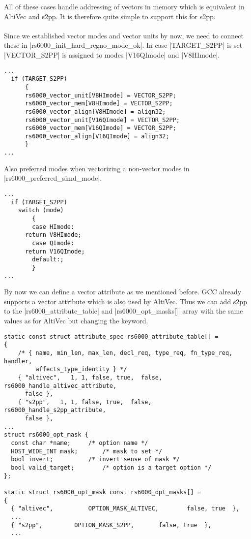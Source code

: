 All of these cases handle addressing of vectors in memory which is equivalent in AltiVec and s2pp.
It is therefore quite simple to support this for s2pp.
\\
\\
Since we established vector modes and vector units by now, we need to connect these in |rs6000_init_hard_regno_mode_ok|.
In case |TARGET_S2PP| is set |VECTOR_S2PP| is assigned to modes |V16QImode| and |V8HImode|.
\begin{lstlisting}
...
  if (TARGET_S2PP)
      {
      rs6000_vector_unit[V8HImode] = VECTOR_S2PP;
      rs6000_vector_mem[V8HImode] = VECTOR_S2PP;
      rs6000_vector_align[V8HImode] = align32;
      rs6000_vector_unit[V16QImode] = VECTOR_S2PP;
      rs6000_vector_mem[V16QImode] = VECTOR_S2PP;
      rs6000_vector_align[V16QImode] = align32;
      }
...
\end{lstlisting}

Also preferred modes when vectorizing a non-vector modes in |rs6000_preferred_simd_mode|.
\begin{lstlisting}
...
  if (TARGET_S2PP)
    switch (mode)
        {
        case HImode:
      return V8HImode;
        case QImode:
      return V16QImode;
        default:;
        }
... 
\end{lstlisting}

By now we can define a vector attribute as we mentioned before.
GCC already supports a vector attribute which is also used by AltiVec.
Thus we can add s2pp to the |rs6000_attribute_table| and |rs6000_opt_masks[]| array with the same values as for AltiVec but changing the keyword.
\begin{lstlisting}
static const struct attribute_spec rs6000_attribute_table[] =
{
    /* { name, min_len, max_len, decl_req, type_req, fn_type_req, handler,
         affects_type_identity } */
    { "altivec",   1, 1, false, true,  false, rs6000_handle_altivec_attribute,
      false },
    { "s2pp",   1, 1, false, true,  false, rs6000_handle_s2pp_attribute,
      false },
...
struct rs6000_opt_mask {
  const char *name;     /* option name */
  HOST_WIDE_INT mask;       /* mask to set */
  bool invert;          /* invert sense of mask */
  bool valid_target;        /* option is a target option */
};

static struct rs6000_opt_mask const rs6000_opt_masks[] =
{
  { "altivec",          OPTION_MASK_ALTIVEC,        false, true  },
  ...
  { "s2pp",         OPTION_MASK_S2PP,       false, true  },
  ...
\end{lstlisting}

